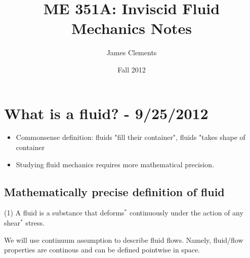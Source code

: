 \documentclass[12pt]{report}
\author{James Clements}
\date{Fall 2012}
\title{ME 351A: Inviscid Fluid Mechanics Notes}
\begin{document}
\maketitle
\tableofcontents
\chapter{What is a fluid? - 9/25/2012}
\begin{itemize}
\item Commonsense definition: fluids "fill their container", fluids "takes shape of container
\item Studying fluid mechanics requires more mathematical precision. 
\end{itemize}
\section{Mathematically precise definition of fluid}
(1) A fluid is a substance that deforms$^*$ continuously under the action of any shear$^*$ stress.

We will use continuum assumption to describe fluid flows. Namely, fluid/flow properties are continous and can be defined pointwise in space.
\end{document}
